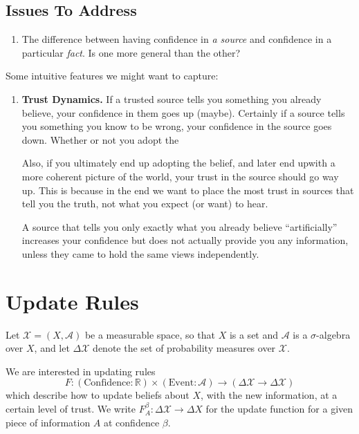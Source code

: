 \documentclass{article}
\begin{document}
\subsection*{Issues To Address}
\begin{enumerate}
    \item The difference between having confidence in \emph{a source} and confidence in a particular \emph{fact}.  Is one more general than the other?
\end{enumerate}

Some intuitive features we might want to capture:
\begin{enumerate}

    \item \textbf{Trust Dynamics.} If a trusted source tells you something you already believe, your confidence in them goes up (maybe). Certainly if a source tells you something you know to be wrong, your confidence in the source goes down.  Whether or not you adopt the

    Also, if you ultimately end up adopting the belief, and later end upwith a more coherent picture of the world, your trust in the source should go way up.
    This is because in the end we want to place the most trust in sources that tell you the truth, not what you expect (or want) to hear.

    A source that tells you only exactly what you already believe ``artificially'' increases your confidence but does not actually provide you any information, unless they came to hold the same views independently.

\end{enumerate}

\TODO
\clearpage

\section{Update Rules}
\def\X{\mathcal X}
Let $\X = (X, \mathcal A)$ be a measurable space, so that $X$ is a set and $\mathcal A$ is a $\sigma$-algebra over $X$, and let $\Delta \X$ denote the set of probability measures over $\X$.

We are interested in updating rules
\[
    F: (\text{Confidence} : \mathbb R) \times (\text{Event} : \mathcal A) \to (\Delta\X  \to \Delta \X)
\]
which describe how to update beliefs about $X$, with the new information, at a certain level of trust. We write $F^\beta_A : \Delta\X \to \Delta X$ for the update function for a given piece of information $A$ at confidence $\beta$.
\end{document}
